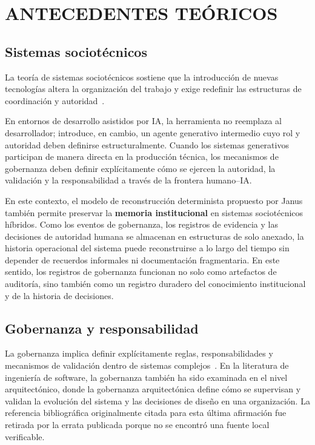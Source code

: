 \documentclass[conference]{IEEEtran}
\begin{document}
\section{ANTECEDENTES TEÓRICOS}
\subsection{Sistemas sociotécnicos}
La teoría de sistemas sociotécnicos sostiene que la introducción de nuevas tecnologías altera la organización del trabajo y exige redefinir las estructuras de coordinación y autoridad~\cite{trist1951}.

En entornos de desarrollo asistidos por IA, la herramienta no reemplaza al desarrollador; introduce, en cambio, un agente generativo intermedio cuyo rol y autoridad deben definirse estructuralmente. Cuando los sistemas generativos participan de manera directa en la producción técnica, los mecanismos de gobernanza deben definir explícitamente cómo se ejercen la autoridad, la validación y la responsabilidad a través de la frontera humano--IA.

En este contexto, el modelo de reconstrucción determinista propuesto por Janus también permite preservar la \textbf{memoria institucional} en sistemas sociotécnicos híbridos. Como los eventos de gobernanza, los registros de evidencia y las decisiones de autoridad humana se almacenan en estructuras de solo anexado, la historia operacional del sistema puede reconstruirse a lo largo del tiempo sin depender de recuerdos informales ni documentación fragmentaria. En este sentido, los registros de gobernanza funcionan no solo como artefactos de auditoría, sino también como un registro duradero del conocimiento institucional y de la historia de decisiones.

\subsection{Gobernanza y responsabilidad}
La gobernanza implica definir explícitamente reglas, responsabilidades y mecanismos de validación dentro de sistemas complejos~\cite{kooi2003}. En la literatura de ingeniería de software, la gobernanza también ha sido examinada en el nivel arquitectónico, donde la gobernanza arquitectónica define cómo se supervisan y validan la evolución del sistema y las decisiones de diseño en una organización. La referencia bibliográfica originalmente citada para esta última afirmación fue retirada por la errata publicada porque no se encontró una fuente local verificable.
\end{document}
